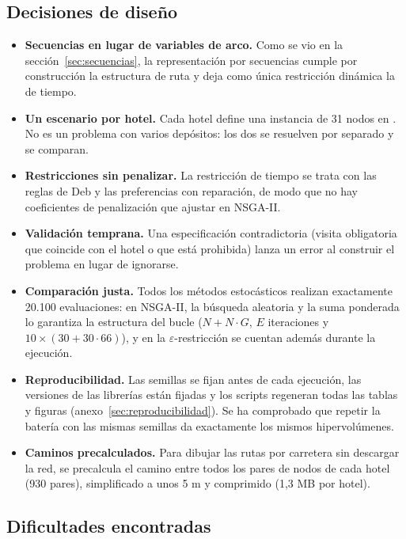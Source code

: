 \subsection{Decisiones de diseño}

\begin{itemize}
  \item \textbf{Secuencias en lugar de variables de arco.} Como se vio en la sección~\ref{sec:secuencias}, la representación por secuencias cumple por construcción la estructura de ruta y deja como única restricción dinámica la de tiempo.
  \item \textbf{Un escenario por hotel.} Cada hotel define una instancia de 31 nodos en . No es un problema con varios depósitos: los dos se resuelven por separado y se comparan.
  \item \textbf{Restricciones sin penalizar.} La restricción de tiempo se trata con las reglas de Deb y las preferencias con reparación, de modo que no hay coeficientes de penalización que ajustar en NSGA-II.
  \item \textbf{Validación temprana.} Una especificación contradictoria (visita obligatoria que coincide con el hotel o que está prohibida) lanza un error al construir el problema en lugar de ignorarse.
  \item \textbf{Comparación justa.} Todos los métodos estocásticos realizan exactamente 20.100 evaluaciones: en NSGA-II, la búsqueda aleatoria y la suma ponderada lo garantiza la estructura del bucle ($N + N \cdot G$, $E$ iteraciones y $10 \times (30 + 30 \cdot 66)$), y en la $\varepsilon$-restricción se cuentan además durante la ejecución.
  \item \textbf{Reproducibilidad.} Las semillas se fijan antes de cada ejecución, las versiones de las librerías están fijadas y los scripts regeneran todas las tablas y figuras (anexo~\ref{sec:reproducibilidad}). Se ha comprobado que repetir la batería con las mismas semillas da exactamente los mismos hipervolúmenes.
  \item \textbf{Caminos precalculados.} Para dibujar las rutas por carretera sin descargar la red, se precalcula el camino entre todos los pares de nodos de cada hotel (930 pares), simplificado a unos 5 m y comprimido (1,3 MB por hotel).
\end{itemize}

\subsection{Dificultades encontradas}

